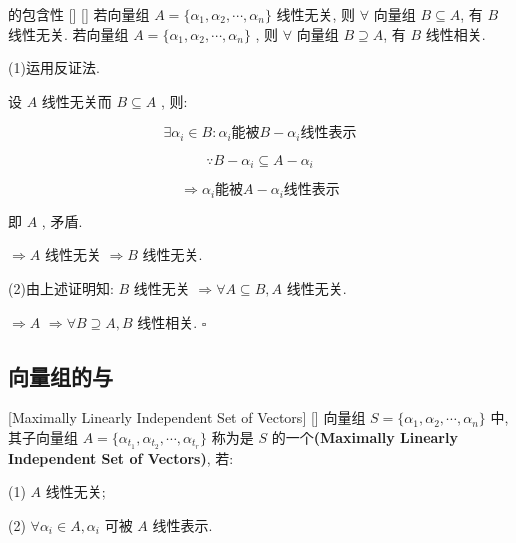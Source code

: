 \documentclass[UTF8]{ctexart}
\DeclareMathOperator{\0}{\mathbf{0}}
\DeclareMathOperator{\<}{\langle}
\renewcommand{\>}{\rangle}
\begin{document}
		\begin{ppt}
			[]
			{ 的包含性}
			[]
			[]
			若向量组 \(A=\{\alpha_{1}, \alpha_{2}, \cdots, \alpha_{n}\}\) 线性无关, 则 \(\forall\) 向量组 \(B\subseteq A\), 有 \(B\) 线性无关. 
			若向量组 \(A=\{\alpha_{1}, \alpha_{2}, \cdots, \alpha_{n}\}\) , 则 \(\forall\) 向量组 \(B\supseteq A\), 有 \(B\) 线性相关. 
						
		\end{ppt}
		\begin{prf}
		
			(1)运用反证法. 
			
			设 \(A\) 线性无关而 \(B\subseteq A\) , 则: 
			
			\[\exists \alpha_{i}\in B: \alpha_{i}\mbox{能被}B-\alpha_{i}\mbox{线性表示}\]
			
			\[\because B-\alpha_{i}\subseteq A-\alpha_{i}\]
			
			\[\Longrightarrow \alpha_{i}\mbox{能被}A-\alpha_{i}\mbox{线性表示}\]
			
			即 \(A\) , 矛盾. 
			
			 \(\Longrightarrow A\) 线性无关 \(\Longrightarrow B\) 线性无关. 
			
			(2)由上述证明知:  \(B\) 线性无关 \(\Longrightarrow \forall A \subseteq B, A\) 线性无关. 
			
			 \(\Longrightarrow A\)  \(\Longrightarrow \forall B \supseteq A, B\) 线性相关.  \(\square\) 
		\end{prf}
	\subsection{向量组的 与\秩}
		
		\begin{dfn}
			{}
			[Maximally Linearly Independent Set of Vectors]
			[]
			向量组 \(S=\{\alpha_{1}, \alpha_{2}, \cdots, \alpha_{n}\}\) 中, 其子向量组 \(A=\{\alpha_{t_{1}}, \alpha_{t_{2}}, \cdots, \alpha_{t_{r}}\}\) 称为是 \(S\) 的一个\textbf{(Maximally Linearly Independent Set of Vectors)}, 若: 
			
			(1) \(A\) 线性无关; 
			
			(2) \(\forall \alpha_{i}\in A, \alpha_{i}\) 可被 \(A\) 线性表示. 
		
		\end{dfn}
			
\end{document}
